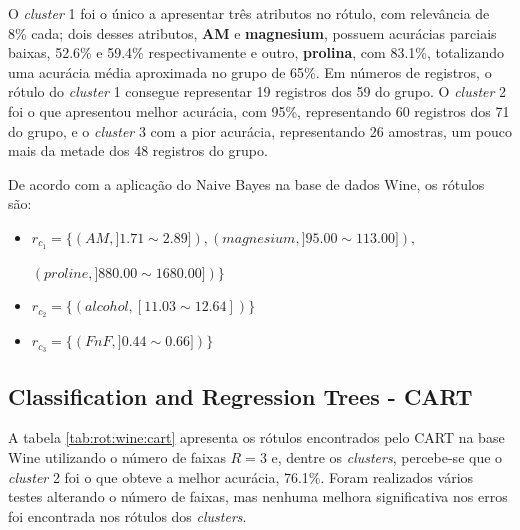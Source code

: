 O \textit{cluster} 1 foi o único a apresentar três atributos no rótulo, com relevância de 8\% cada; dois desses atributos, \textbf{AM} e \textbf{magnesium}, possuem acurácias parciais baixas, 52.6\% e 59.4\% respectivamente e outro, \textbf{prolina}, com 83.1\%, totalizando uma acurácia média aproximada no grupo de 65\%. Em números de registros, o rótulo do \textit{cluster} 1 consegue representar 19 registros dos 59 do grupo. O \textit{cluster} 2 foi o que apresentou melhor acurácia, com 95\%, representando 60 registros dos 71 do grupo, e o \textit{cluster} 3 com a pior acurácia, representando 26 amostras, um pouco mais da metade dos 48 registros do grupo. 




De acordo com a aplicação do Naive Bayes na base de dados Wine, os rótulos são: 

\begin{itemize}[noitemsep]
    \item ${r_{c_1}=\{ (AM, ] 1.71  \sim  2.89]),(magnesium, ] 95.00 \sim  113.00]),}$
    
    ${(proline, ] 880.00 \sim 1680.00]) \} }$
    \item ${r_{c_2}=\{(alcohol,[   11.03 \sim  12.64  ] ) \} }$
    \item ${r_{c_3}=\{ (FnF, ] 0.44 \sim 0.66 ])\} }$
 \end{itemize}


\subsection{Classification and Regression Trees - CART} \label{cap:resultados:ssec:wine:cart}

A tabela \ref{tab:rot:wine:cart} apresenta os rótulos encontrados pelo CART na base Wine utilizando o número de faixas ${R=3}$ e, dentre os \textit{clusters}, percebe-se que o \textit{cluster} 2 foi o que obteve a melhor acurácia, 76.1\%. Foram realizados vários testes alterando o número de faixas, mas nenhuma melhora significativa nos erros foi encontrada nos rótulos dos \textit{clusters}. 

